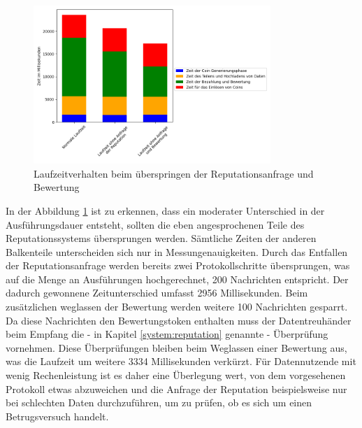 \documentclass{scrreprt}
\begin{document}
\begin{figure}[h]
    \caption{Laufzeitverhalten beim überspringen der Reputationsanfrage und Bewertung}
    \label{fig:win_noRep}
    \centering
    \includegraphics[width=0.8\textwidth]{figure_win_noRep.png}
\end{figure}
In der Abbildung \ref{fig:win_noRep} ist zu erkennen, dass ein moderater Unterschied in der Ausführungsdauer entsteht, sollten die eben angesprochenen Teile des Reputationssystems übersprungen werden. Sämtliche Zeiten der anderen Balkenteile unterscheiden sich nur in Messungenauigkeiten. Durch das Entfallen der Reputationsanfrage werden bereits zwei Protokollschritte übersprungen, was auf die Menge an Ausführungen hochgerechnet, 200 Nachrichten entspricht. Der dadurch gewonnene Zeitunterschied umfasst 2956 Millisekunden. Beim zusätzlichen weglassen der Bewertung werden weitere 100 Nachrichten gesparrt. Da diese Nachrichten den Bewertungstoken enthalten muss der Datentreuhänder beim Empfang die - in Kapitel \ref{system:reputation} genannte - Überprüfung vornehmen. Diese Überprüfungen bleiben beim Weglassen einer Bewertung aus, was die Laufzeit um weitere 3334 Millisekunden verkürzt. Für Datennutzende mit wenig Rechenleistung ist es daher eine Überlegung wert, von dem vorgesehenen Protokoll etwas abzuweichen und die Anfrage der Reputation beispielsweise nur bei schlechten Daten durchzuführen, um zu prüfen, ob es sich um einen Betrugsversuch handelt.
\end{document}
